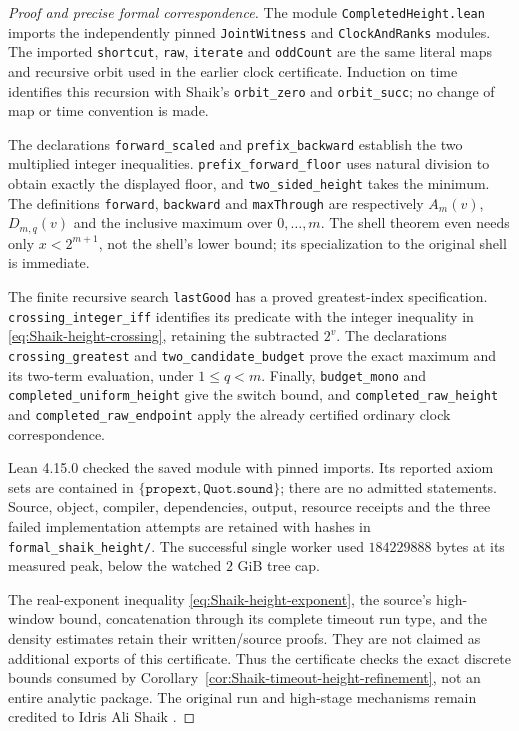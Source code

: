 \begin{proof}[Proof and precise formal correspondence]
The module \texttt{CompletedHeight.lean} imports the independently pinned
\texttt{JointWitness} and \texttt{ClockAndRanks} modules. The imported
\texttt{shortcut}, \texttt{raw}, \texttt{iterate} and \texttt{oddCount}
are the same literal maps and recursive orbit used in the earlier
clock certificate. Induction on time identifies this recursion with
Shaik's \texttt{orbit\_zero} and \texttt{orbit\_succ}; no change of map
or time convention is made.

The declarations \texttt{forward\_scaled} and
\texttt{prefix\_backward} establish the two multiplied integer
inequalities. \texttt{prefix\_forward\_floor} uses natural division to
obtain exactly the displayed floor, and \texttt{two\_sided\_height}
takes the minimum. The definitions \texttt{forward}, \texttt{backward}
and \texttt{maxThrough} are respectively \(A_m(v)\), \(D_{m,q}(v)\)
and the inclusive maximum over \(0,\ldots,m\).
The shell theorem even needs only \(x<2^{m+1}\), not the shell's lower
bound; its specialization to the original shell is immediate.

The finite recursive search \texttt{lastGood} has a proved greatest-index
specification. \texttt{crossing\_integer\_iff} identifies its predicate
with the integer inequality in \eqref{eq:Shaik-height-crossing}, retaining
the subtracted \(2^v\). The declarations \texttt{crossing\_greatest}
and \texttt{two\_candidate\_budget} prove the exact maximum and its
two-term evaluation, under \(1\le q<m\).
Finally, \texttt{budget\_mono} and \texttt{completed\_uniform\_height}
give the switch bound, and \texttt{completed\_raw\_height} and
\texttt{completed\_raw\_endpoint} apply the already certified ordinary
clock correspondence.

Lean 4.15.0 checked the saved module with pinned imports. Its reported
axiom sets are contained in \(\{\texttt{propext},\texttt{Quot.sound}\}\);
there are no admitted statements. Source, object, compiler, dependencies,
output, resource receipts and the three failed implementation attempts
are retained with hashes in \texttt{formal\_shaik\_height/}.
The successful single worker used \(184229888\) bytes at its measured
peak, below the watched \(2\) GiB tree cap.

The real-exponent inequality \eqref{eq:Shaik-height-exponent}, the
source's high-window bound, concatenation through its complete timeout
run type, and the density estimates retain their written/source proofs.
They are not claimed as additional exports of this certificate.
Thus the certificate checks the exact discrete bounds consumed by
Corollary~\ref{cor:Shaik-timeout-height-refinement}, not an entire analytic
package. The original run and high-stage mechanisms remain credited to
Idris Ali Shaik \cite{Shaik2026v324}.
\end{proof}

